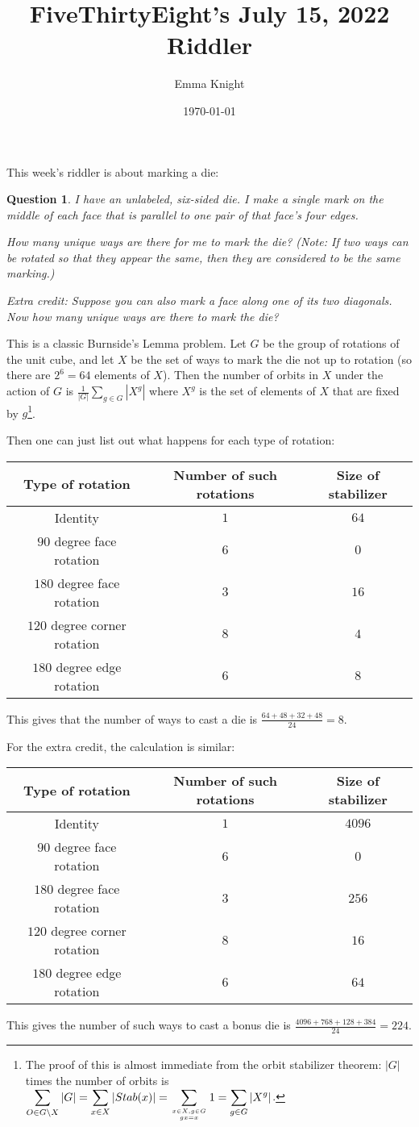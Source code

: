\documentclass[11pt]{article}
\title{FiveThirtyEight's July 15, 2022 Riddler}
\author{Emma Knight}
\date{\today}
\newtheorem{question}[theorem]{Question}
\theoremstyle{definition}
\begin{document}
This week's riddler is about marking a die:
\begin{question}
I have an unlabeled, six-sided die. I make a single mark on the middle of each face that is parallel to one pair of that face’s four edges.

How many unique ways are there for me to mark the die? (Note: If two ways can be rotated so that they appear the same, then they are considered to be the same marking.)

\emph{Extra credit}: Suppose you can also mark a face along one of its two diagonals. Now how many unique ways are there to mark the die?
\end{question}

This is a classic Burnside's Lemma problem.  Let $G$ be the group of rotations of the unit cube, and let $X$ be the set of ways to mark the die not up to rotation (so there are $2^6 = 64$ elements of $X$).  Then the number of orbits in $X$ under the action of $G$ is $\displaystyle{\frac{1}{|G|}\sum_{g \in G}|X^g|}$ where $X^g$ is the set of elements of $X$ that are fixed by $g$\footnote{The proof of this is almost immediate from the orbit stabilizer theorem: $|G|$ times the number of orbits is $\displaystyle{\sum_{O \in G\backslash X} |G| = \sum_{x \in X} |Stab(x)| = \sum_{x \in X, g \in G \atop gx = x} 1 = \sum_{g \in G} |X^g|}$.}.

Then one can just list out what happens for each type of rotation:

\begin{tabular}{c|c|c}
Type of rotation & Number of such rotations & Size of stabilizer \\ \hline \hline 
Identity & $1$ & $64$  \\\hline 
$90$ degree face rotation & $6$ & $0$ \\ \hline
$180$ degree face rotation & $3$ & $16$ \\ \hline
$120$ degree corner rotation & $8$ & $4$ \\ \hline
$180$ degree edge rotation & $6$ & $8$
\end{tabular}

This gives that the number of ways to cast a die is $\frac{64+48 + 32 + 48}{24} = 8$.

For the extra credit, the calculation is similar:

\begin{tabular}{c|c|c}
Type of rotation & Number of such rotations & Size of stabilizer \\ \hline \hline 
Identity & $1$ & $4096$  \\\hline 
$90$ degree face rotation & $6$ & $0$ \\ \hline
$180$ degree face rotation & $3$ & $256$ \\ \hline
$120$ degree corner rotation & $8$ & $16$ \\ \hline
$180$ degree edge rotation & $6$ & $64$
\end{tabular}

This gives the number of such ways to cast a bonus die is $\frac{4096 + 768 + 128 + 384}{24} = 224$.
\end{document}

